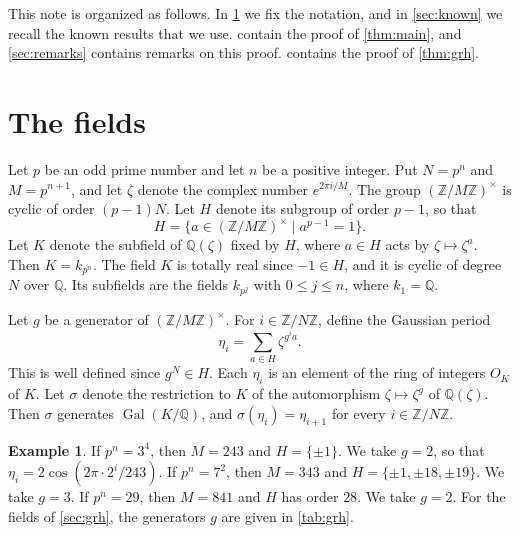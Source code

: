 \documentclass[11pt]{amsart}
\theoremstyle{plain}
\theoremstyle{definition}
\newtheorem{example}[theorem]{Example}
\begin{document}
This note is organized as follows.
In \cref{sec:field} we fix the notation, and in \cref{sec:known} we recall the known results that we use.
 contain the proof of \cref{thm:main}, and \cref{sec:remarks} contains remarks on this proof.
 contains the proof of \cref{thm:grh}.

\section{The fields} \label{sec:field}

Let $p$ be an odd prime number and let $n$ be a positive integer.
Put $N = p^n$ and $M = p^{n+1}$, and let $\zeta$ denote the complex number $e^{2\pi i/M}$.
The group $(\mathbb{Z}/M\mathbb{Z})^\times$ is cyclic of order $(p-1)N$.
Let $H$ denote its subgroup of order $p - 1$, so that
\[
H = \{a \in (\mathbb{Z}/M\mathbb{Z})^\times \mid a^{p-1} = 1\}.
\]
Let $K$ denote the subfield of $\mathbb{Q}(\zeta)$ fixed by $H$, where $a \in H$ acts by $\zeta \mapsto \zeta^a$.
Then $K = k_{p^n}$.
The field $K$ is totally real since $-1 \in H$, and it is cyclic of degree $N$ over $\mathbb{Q}$.
Its subfields are the fields $k_{p^j}$ with $0 \le j \le n$, where $k_1 = \mathbb{Q}$.

Let $g$ be a generator of $(\mathbb{Z}/M\mathbb{Z})^\times$.
For $i \in \mathbb{Z}/N\mathbb{Z}$, define the Gaussian period
\[
\eta_i = \sum_{a \in H} \zeta^{g^i a} .
\]
This is well defined since $g^N \in H$.
Each $\eta_i$ is an element of the ring of integers $O_K$ of $K$.
Let $\sigma$ denote the restriction to $K$ of the automorphism $\zeta \mapsto \zeta^g$ of $\mathbb{Q}(\zeta)$.
Then $\sigma$ generates $\operatorname{Gal}(K/\mathbb{Q})$, and $\sigma(\eta_i) = \eta_{i+1}$ for every $i \in \mathbb{Z}/N\mathbb{Z}$.

\begin{example} \label{ex:fields}
If $p^n = 3^4$, then $M = 243$ and $H = \{\pm 1\}$. We take $g = 2$, so that $\eta_i = 2\cos(2\pi \cdot 2^i/243)$.
If $p^n = 7^2$, then $M = 343$ and $H = \{\pm 1, \pm 18, \pm 19\}$. We take $g = 3$.
If $p^n = 29$, then $M = 841$ and $H$ has order $28$. We take $g = 2$.
For the fields of \cref{sec:grh}, the generators $g$ are given in \cref{tab:grh}.
\end{example}
\end{document}
